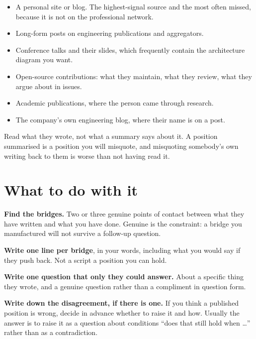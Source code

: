 \begin{itemize}
  \item A personal site or blog. The highest-signal source and the most often
        missed, because it is not on the professional network.
  \item Long-form posts on engineering publications and aggregators.
  \item Conference talks and their slides, which frequently contain the
        architecture diagram you want.
  \item Open-source contributions: what they maintain, what they review, what
        they argue about in issues.
  \item Academic publications, where the person came through research.
  \item The company's own engineering blog, where their name is on a post.
\end{itemize}

\begin{kitnote}
Read what they wrote, not what a summary says about it. A position summarised
is a position you will misquote, and misquoting somebody's own writing back to
them is worse than not having read it.
\end{kitnote}

\section{What to do with it}

\begin{kitmethod}
\textbf{Find the bridges.} Two or three genuine points of contact between what
they have written and what you have done. Genuine is the constraint: a bridge
you manufactured will not survive a follow-up question.

\textbf{Write one line per bridge}, in your words, including what you would say
if they push back. Not a script \dash{} a position you can hold.

\textbf{Write one question that only they could answer.} About a specific thing
they wrote, and a genuine question rather than a compliment in question form.

\textbf{Write down the disagreement, if there is one.} If you think a published
position is wrong, decide in advance whether to raise it and how. Usually the
answer is to raise it as a question about conditions \dash{} ``does that still
hold when \ldots'' \dash{} rather than as a contradiction.
\end{kitmethod}

